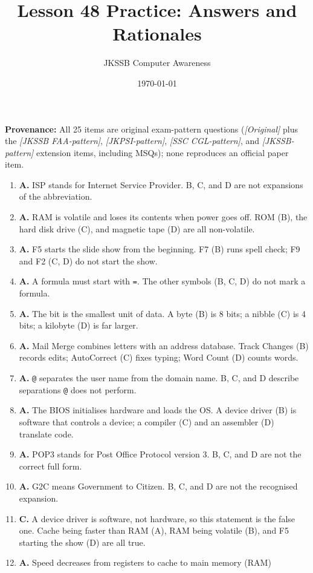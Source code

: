\documentclass[11pt]{article}
\title{Lesson 48 Practice: Answers and Rationales}
\author{JKSSB Computer Awareness}
\date{\today}
\begin{document}
\maketitle
\noindent\textbf{Provenance:} All 25 items are original exam-pattern questions (\textit{[Original]} plus the \textit{[JKSSB FAA-pattern]}, \textit{[JKPSI-pattern]}, \textit{[SSC CGL-pattern]}, and \textit{[JKSSB-pattern]} extension items, including MSQs); none reproduces an official paper item.
\begin{enumerate}[label=\textbf{Q\arabic*.}, leftmargin=*]
\item \textbf{A.} ISP stands for Internet Service Provider. B, C, and D are
  not expansions of the abbreviation.
\item \textbf{A.} RAM is volatile and loses its contents when power goes off.
  ROM (B), the hard disk drive (C), and magnetic tape (D) are all
  non-volatile.
\item \textbf{A.} F5 starts the slide show from the beginning. F7 (B) runs
  spell check; F9 and F2 (C, D) do not start the show.
\item \textbf{A.} A formula must start with \texttt{=}. The other symbols (B,
  C, D) do not mark a formula.
\item \textbf{A.} The bit is the smallest unit of data. A byte (B) is 8 bits;
  a nibble (C) is 4 bits; a kilobyte (D) is far larger.
\item \textbf{A.} Mail Merge combines letters with an address database. Track
  Changes (B) records edits; AutoCorrect (C) fixes typing; Word Count (D)
  counts words.
\item \textbf{A.} \texttt{@} separates the user name from the domain name. B,
  C, and D describe separations \texttt{@} does not perform.
\item \textbf{A.} The BIOS initialises hardware and loads the OS. A device
  driver (B) is software that controls a device; a compiler (C) and an
  assembler (D) translate code.
\item \textbf{A.} POP3 stands for Post Office Protocol version 3. B, C, and D
  are not the correct full form.
\item \textbf{A.} G2C means Government to Citizen. B, C, and D are not the
  recognised expansion.
\item \textbf{C.} A device driver is software, not hardware, so this statement
  is the false one. Cache being faster than RAM (A), RAM being volatile (B),
  and F5 starting the show (D) are all true.
\item \textbf{A.} Speed decreases from registers to cache to main memory (RAM)

\end{enumerate}
\end{document}
